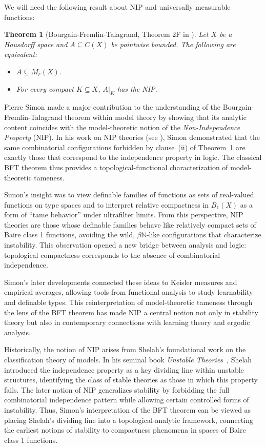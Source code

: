\documentclass[psamsfonts]{amsart}
\newtheorem{thm}{Theorem}[section]
\theoremstyle{definition}
\theoremstyle{remark}
\numberwithin{equation}{section}
\begin{document}
We will need the following result about NIP and universally measurable functions:

\begin{thm}[Bourgain-Fremlin-Talagrand, Theorem 2F in \cite{BFT_1978_PCompactBaire}]\label{BFT}
    Let $X$ be a Hausdorff space and $A\subseteq C(X)$ be pointwise bounded. The following are equivalent:
    \begin{itemize}
        \item [(i)] $\overline{A}\subseteq M_r(X)$.
        \item [(ii)] For every compact $K\subseteq X$, $A|_K$ has the NIP.
    \end{itemize}
\end{thm}

Pierre Simon made a major contribution to the understanding of the Bourgain-Fremlin-Talagrand theorem within model theory by showing that its analytic content coincides with the model-theoretic notion of the \emph{Non-Independence Property} (NIP). In his work on NIP theories (see \cite{simon2015nip}), Simon demonstrated that the same combinatorial configurations forbidden by clause~(ii) of Theorem~\ref{BFT} are exactly those that correspond to the independence property in logic. The classical BFT theorem thus provides a topological-functional characterization of model-theoretic tameness.

Simon's insight was to view definable families of functions as sets of real-valued functions on type spaces and to interpret relative compactness in $B_1(X)$ as a form of “tame behavior” under ultrafilter limits. From this perspective, NIP theories are those whose definable families behave like relatively compact sets of Baire class 1 functions, avoiding the wild, $\beta\mathbb N$-like configurations that characterize instability. This observation opened a new bridge between analysis and logic: topological compactness corresponds to the absence of combinatorial independence.

Simon's later developments connected these ideas to Keisler measures and empirical averages, allowing tools from functional analysis to study learnability and definable types. This reinterpretation of model-theoretic tameness through the lens of the BFT theorem has made NIP a central notion not only in stability theory but also in contemporary connections with learning theory and ergodic analysis.

Historically, the notion of NIP arises from Shelah's foundational work on the classification theory of models. In his seminal book \emph{Unstable Theories}~\cite{shelah1978unstable}, Shelah introduced the independence property as a key dividing line within unstable structures, identifying the class of stable theories as those in which this property fails. The later notion of NIP generalizes stability by forbidding the full combinatorial independence pattern while allowing certain controlled forms of instability. Thus, Simon's interpretation of the BFT theorem can be viewed as placing Shelah's dividing line into a topological-analytic framework, connecting the earliest notions of stability to compactness phenomena in spaces of Baire class 1 functions.
\end{document}
